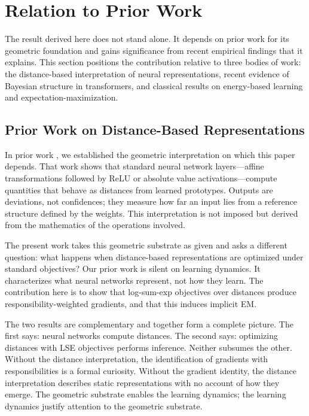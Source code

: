 \section{Relation to Prior Work}

The result derived here does not stand alone. It depends on prior work for its geometric foundation and gains significance from recent empirical findings that it explains. This section positions the contribution relative to three bodies of work: the distance-based interpretation of neural representations, recent evidence of Bayesian structure in transformers, and classical results on energy-based learning and expectation-maximization.

\subsection{Prior Work on Distance-Based Representations}

In prior work \citep{oursland2024interpreting}, we established the geometric interpretation on which this paper depends. That work shows that standard neural network layers---affine transformations followed by ReLU or absolute value activations---compute quantities that behave as distances from learned prototypes. Outputs are deviations, not confidences; they measure how far an input lies from a reference structure defined by the weights. This interpretation is not imposed but derived from the mathematics of the operations involved.

The present work takes this geometric substrate as given and asks a different question: what happens when distance-based representations are optimized under standard objectives? Our prior work is silent on learning dynamics. It characterizes what neural networks represent, not how they learn. The contribution here is to show that log-sum-exp objectives over distances produce responsibility-weighted gradients, and that this induces implicit EM.

The two results are complementary and together form a complete picture. The first says: neural networks compute distances. The second says: optimizing distances with LSE objectives performs inference. Neither subsumes the other. Without the distance interpretation, the identification of gradients with responsibilities is a formal curiosity. Without the gradient identity, the distance interpretation describes static representations with no account of how they emerge. The geometric substrate enables the learning dynamics; the learning dynamics justify attention to the geometric substrate.

